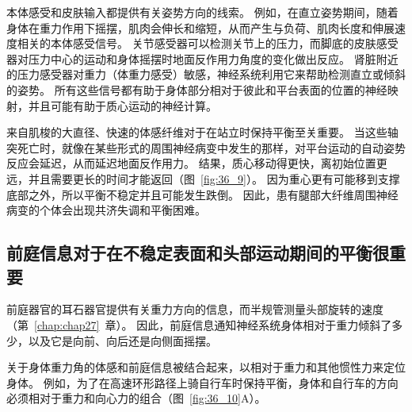 本体感受和皮肤输入都提供有关姿势方向的线索。
例如，在直立姿势期间，随着身体在重力作用下摇摆，肌肉会伸长和缩短，从而产生与负荷、肌肉长度和伸展速度相关的本体感受信号。
关节感受器可以检测关节上的压力，而脚底的皮肤感受器对压力中心的运动和身体摇摆时地面反作用力角度的变化做出反应。
肾脏附近的压力感受器对重力（体重力感受）敏感，神经系统利用它来帮助检测直立或倾斜的姿势。
所有这些信号都有助于身体部分相对于彼此和平台表面的位置的神经映射，并且可能有助于质心运动的神经计算。


来自肌梭的大直径、快速的体感纤维对于在站立时保持平衡至关重要。
当这些轴突死亡时，就像在某些形式的周围神经病变中发生的那样，对平台运动的自动姿势反应会延迟，从而延迟地面反作用力。
结果，质心移动得更快，离初始位置更远，并且需要更长的时间才能返回（图~\ref{fig:36_9}）。
因为重心更有可能移到支撑底部之外，所以平衡不稳定并且可能发生跌倒。
因此，患有腿部大纤维周围神经病变的个体会出现共济失调和平衡困难。



\subsection{前庭信息对于在不稳定表面和头部运动期间的平衡很重要}

前庭器官的耳石器官提供有关重力方向的信息，而半规管测量头部旋转的速度（第~\ref{chap:chap27}~章）。
因此，前庭信息通知神经系统身体相对于重力倾斜了多少，以及它是向前、向后还是向侧面摇摆。


关于身体重力角的体感和前庭信息被结合起来，以相对于重力和其他惯性力来定位身体。
例如，为了在高速环形路径上骑自行车时保持平衡，身体和自行车的方向必须相对于重力和向心力的组合（图~\ref{fig:36_10}A）。


